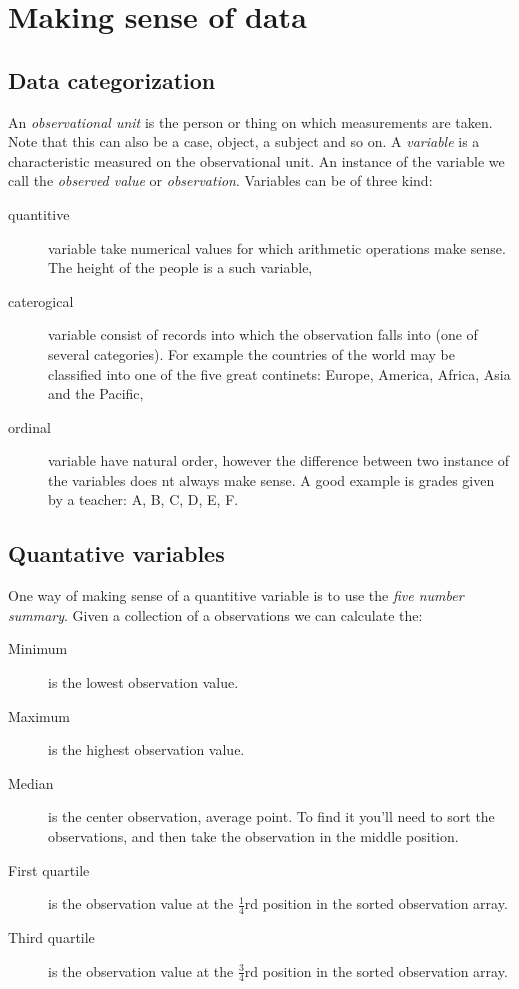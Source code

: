 \chapter*{Making sense of data}
\setcounter{section}{0}
\renewcommand*{\theHsection}{ch1.\the\value{section}}

\section{Data categorization}

An \emph{observational unit} is the person or thing on which measurements are
taken. Note that this can also be a case, object, a subject and so on. A
\emph{variable} is a characteristic measured on the observational unit. An
instance of the variable we call the \emph{observed value} or
\emph{observation}. Variables can be of three kind:

\begin{description}
	\item[quantitive] variable take numerical values for which arithmetic
	      operations make sense. The height of the people is a such variable,
	\item[caterogical] variable consist of records into which the observation
	      falls into (one of several categories). For example the countries of the
	      world may be classified into one of the five great continets: Europe, America,
	      Africa, Asia and the Pacific,
	\item[ordinal] variable have natural order, however the difference between two
	      instance of the variables does nt always make sense. A good example is grades
	      given by a teacher: A, B, C, D, E, F.

\end{description}

\section{Quantative variables}

One way of making sense of a quantitive variable is to use the \emph{five
	number summary}. Given a collection of a observations we can calculate the:

\begin{description}
	\item[Minimum] is the lowest observation value.
	\item[Maximum] is the highest observation value.
	\item[Median] is the center observation, average point. To find it you'll need
	      to sort the observations, and then take the observation in the middle
	      position.
	\item[First quartile] is the observation value at the $\frac{1}{4}$rd position
	      in the sorted observation array.
	\item[Third quartile] is the observation value at the $\frac{3}{4}$rd position
	      in the sorted observation array.
\end{description}

